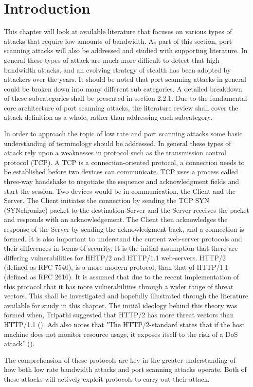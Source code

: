 \section*{Introduction}
This chapter will look at available literature that focuses on various types of attacks that require low amounts of bandwidth. As part of this section, port scanning attacks will also be addressed and studied with supporting literature. In general these types of attack are much more difficult to detect that high bandwidth attacks, and an evolving strategy of stealth has been adopted by attackers over the years. It should be noted that port scanning attacks in general could be broken down into many different sub categories. A detailed breakdown of these subcategories shall be presented in section 2.2.1. Due to the fundamental core architecture of port scanning attacks, the literature review shall cover the attack definition as a whole, rather than addressing each subcategory.

In order to approach the topic of low rate and port scanning attacks some basic understanding of terminology should be addressed. In general these types of attack rely upon a weaknesses in protocol such as the transmission control protocol (TCP). A TCP is a connection-oriented protocol, a connection needs to be established before two devices can communicate. TCP uses a process called three-way handshake to negotiate the sequence and acknowledgment fields and start the session. Two devices would be in communication, the Client and the Server. The Client initiates the connection by sending the TCP SYN (SYNchronize) packet to the destination Server and the Server receives the packet and responds with an acknowledgement. The Client then acknowledges the response of the Server by sending the acknowledgment back, and a connection is formed. 
It is also important to understand the current web-server protocols and their differences in terms of security. It is the initial assumption that there are differing vulnerabilities for HHTP/2 and HTTP/1.1 web-servers. HTTP/2 (defined as RFC 7540), is a more modern protocol, than that of HTTP/1.1 (defined as RFC 2616). It is assumed that due to the recent implementation of this protocol that it has more vulnerabilities through a wider range of threat vectors. This shall be investigated and hopefully illustrated through the literature available for study in this chapter. The initial ideology behind this theory was formed when, Tripathi suggested that HTTP/2 has more threat vectors than HTTP/1.1 (\cite{tripathi2018slow}). Adi also notes that "The HTTP/2-standard states that if the host machine does not monitor resource usage, it exposes itself to the risk of a DoS attack" (\cite{Adi2015}).

The comprehension of these protocols are key in the greater understanding of how both low rate bandwidth attacks and port scanning attacks operate. Both of these attacks will actively exploit protocols to carry out their attack. 